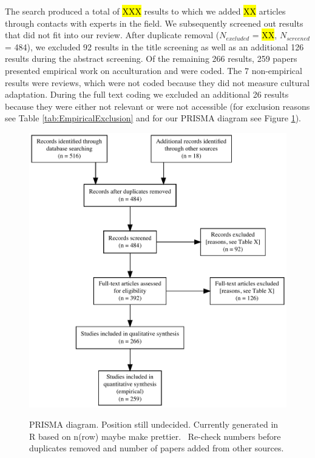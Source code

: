 The search produced a total of \hl{XXX} results to which we added
\hl{XX} articles through contacts with experts in the field. We
subsequently screened out results that did not fit into our review.
After duplicate removal (\(N_{excluded}\) = \hl{XX}, \(N_{screened}\) =
484), we excluded 92 results in the title screening as well as an
additional 126 results during the abstract screening. Of the remaining
266 results, 259 papers presented empirical work on acculturation and
were coded. The 7 non-empirical results were reviews, which were not
coded because they did not measure cultural adaptation. During the full
text coding we excluded an additional 26 results because they were
either not relevant or were not accessible (for exclusion reasons see
Table \ref{tab:EmpiricalExclusion} and for our PRISMA diagram see Figure
\ref{fig:PRISMA}).

\begin{figure}[h]
\centering
\caption{PRISMA diagram. Position still undecided. Currently generated in R based on n(row) maybe make prettier. \Warning\ Re-check numbers before duplicates removed and number of papers added from other sources.}
\includegraphics[width=\textwidth]{Figures/PRISMA}
\label{fig:PRISMA}
\end{figure}

